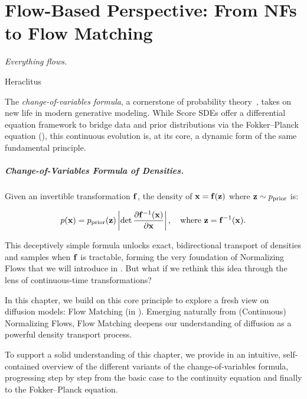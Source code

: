 \chapter{Flow-Based Perspective: From NFs to Flow Matching}\label{ch:flow-based}


\epigraph{
    \textit{Everything flows.
}}{Heraclitus}


The \emph{change-of-variables formula}, a cornerstone of probability theory~\citep{tabak2010density,tabak2013family}, takes on new life in modern generative modeling. While Score SDEs offer a differential equation framework to bridge data and prior distributions via the Fokker–Planck equation (), this continuous evolution is, at its core, a dynamic form of the same fundamental principle.
\paragraph{Change-of-Variables Formula of Densities.}
Given an invertible transformation ${\mathbf{f}}$, the density of ${\mathbf{x}} = {\mathbf{f}}({\mathbf{z}})$ where ${\mathbf{z}} \sim p_{\text{prior}}$ is:
\begin{mdframed}
\begin{align}\label{eq:nf-change-of-var}
p({\mathbf{x}}) = p_{\text{prior}}({\mathbf{z}}) \left| \det \frac{\partial {\mathbf{f}}^{-1}({\mathbf{x}})}{\partial {\mathbf{x}}} \right|, \quad \text{where } {\mathbf{z}} = {\mathbf{f}}^{-1}({\mathbf{x}}).
\end{align}
\end{mdframed}
This deceptively simple formula unlocks exact, bidirectional transport of densities and samples when ${\mathbf{f}}$ is tractable, forming the very foundation of Normalizing Flows that we will introduce in . But what if we rethink this idea through the lens of continuous-time transformations?

In this chapter, we build on this core principle to explore a fresh view on diffusion models: Flow Matching (in ). Emerging naturally from (Continuous) Normalizing Flows, Flow Matching deepens our understanding of diffusion as a powerful density transport process.

To support a solid understanding of this chapter, we provide in  an intuitive, self-contained overview of the different variants of the change-of-variables formula, progressing step by step from the basic case to the continuity equation and finally to the Fokker–Planck equation.

\newpage

